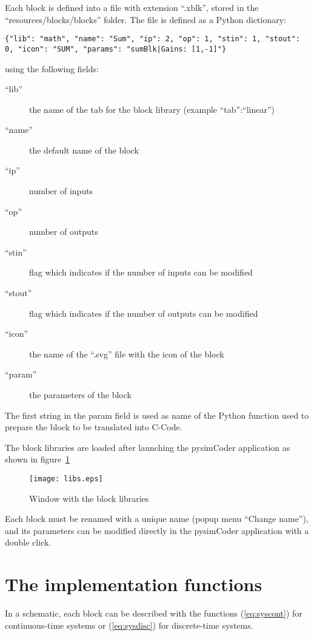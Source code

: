 Each block is defined into a file with extension ``.xblk'', stored in the ``resources/blocks/blocks'' folder.
The file is defined as a Python dictionary:

\scriptsize
\begin{verbatim}
{"lib": "math", "name": "Sum", "ip": 2, "op": 1, "stin": 1, "stout": 0, "icon": "SUM", "params": "sumBlk|Gains: [1,-1]"}
\end{verbatim}
\normalsize

using the following fields:

\begin{description}
\item[``lib''] the name of the tab for the block library (example 
``tab'':``linear'')
\item [``name''] the default name of the block
\item [``ip''] number of inputs
\item [``op''] number of outputs
\item [``stin''] flag which indicates if the number of inputs can be modified
\item [``stout''] flag which indicates if the number of outputs can be modified
\item [``icon'']the name of the ``.svg'' file with the icon of the block
\item [``param''] the parameters of the block
\end{description}

The first string in the param field is used as name of the Python function used 
to prepare the block to be translated into C-Code.

The block libraries are loaded after launching the pysimCoder application as shown 
in figure~\ref{Fig:app1}

 \begin{figure}[htbp]	%
 \centering
 \texttt{[image: libs.eps]}
 \caption{Window with the block libraries}
 \label{Fig:app1}
 \end{figure}

Each block must be renamed with a unique name (popup menu ``Change name''), and 
its parameters can be modified directly in the pysimCoder application with a double 
click.

\section{The implementation functions}

In a schematic, each block can be described with the functions 
(\ref{eq:syscont}) for continuous-time systems or (\ref{eq:sysdisc}) for 
discrete-time systems.

